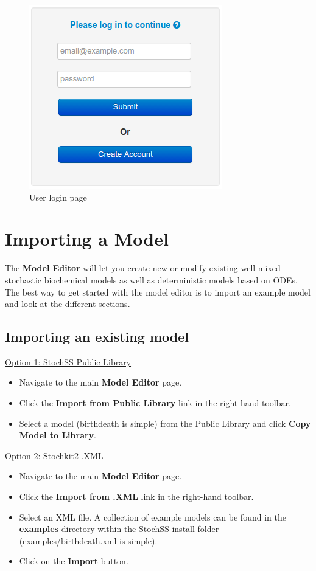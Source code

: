 \begin{figure}[!htb]
\centering
\includegraphics[scale=0.64]{T1/login.png}
\caption{User login page}
\label{fig:login}
\end{figure}

\section{\label{sec:imp} Importing a Model}
The \textbf{Model Editor} will let you create new or modify existing well-mixed stochastic biochemical models as well as deterministic models based on ODEs.
The best way to get started with the model editor is to import an example model and look at the different sections.

\subsection{Importing an existing model}

\underline{Option 1: StochSS Public Library}
\begin{itemize}
  \item Navigate to the main \textbf{Model Editor} page.
  \item Click the \textbf{Import from Public Library} link in the right-hand toolbar.
  \item Select a model (birthdeath is simple) from the Public Library and click \textbf{Copy Model to Library}.
\end{itemize}

\underline{Option 2: Stochkit2 .XML}
\begin{itemize}
  \item Navigate to the main \textbf{Model Editor} page.
  \item Click the \textbf{Import from .XML} link in the right-hand toolbar.
  \item Select an XML file. A collection of example models can be found in the \textbf{examples} directory within the StochSS install folder (examples/birthdeath.xml is simple).
  \item Click on the \textbf{Import} button.
\end{itemize}

